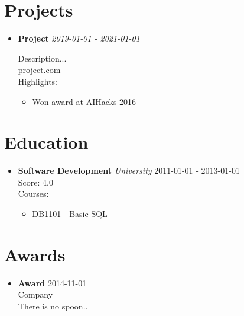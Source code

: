 \documentclass{article}
\newcommand{\entry}[2]{
    \textbf{#1} \hfill \textit{#2}
}
\begin{document}
\section*{Projects}
\begin{itemize}[leftmargin=*]
		
	\item \entry{Project}{2019-01-01 - 2021-01-01} 
	\vspace{0.1in}
	Description... \\
	\href{https://project.com/}{project.com}\\
	Highlights:
	\begin{itemize}
				
				\item Won award at AIHacks 2016
					
		\end{itemize}
		\vspace{0.2in}
			
\end{itemize}
		

\section*{Education}
\begin{itemize}[leftmargin=*]
		
	\item \entry{Software Development}{University} \hfill 2011-01-01 - 2013-01-01 \\
				
		Score: 4.0\\
					
		Courses:
		\begin{itemize}
					
			\item DB1101 - Basic SQL
						\end{itemize}
	\end{itemize}
		

\section*{Awards}
\begin{itemize}[leftmargin=*]
		
	\item \textbf{Award} \hfill 2014-11-01\\
	Company \\
	There is no spoon..
				
\end{itemize}
		
\end{document}
